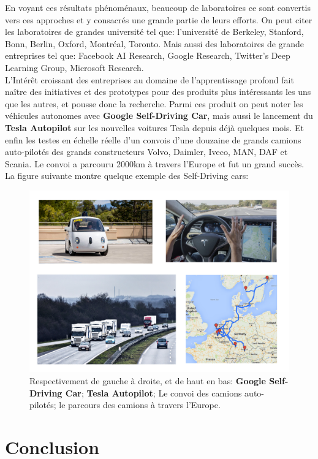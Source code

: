 	En voyant ces résultats phénoménaux, beaucoup de laboratoires ce sont convertis vers ces approches et y consacrés une grande partie de leurs efforts. On peut citer les laboratoires de grandes université tel que: l'université de Berkeley, Stanford, Bonn, Berlin, Oxford, Montréal, Toronto. Mais aussi des laboratoires de grande entreprises tel que: Facebook AI Research, Google Research, Twitter’s Deep Learning Group, Microsoft Research.\\

	L’Intérêt croissant des entreprises au domaine de l'apprentissage profond fait naître des initiatives et des prototypes pour des produits plus intéressants les uns que les autres, et pousse donc la recherche. Parmi ces produit on peut noter les véhicules autonomes avec \textbf{Google Self-Driving Car}, mais aussi le lancement du \textbf{Tesla Autopilot} sur les nouvelles voitures Tesla depuis déjà quelques mois. Et enfin les testes en échelle réelle d'un convois d'une douzaine de grands camions auto-pilotés des grands constructeurs Volvo, Daimler, Iveco, MAN, DAF et Scania. Le convoi a parcouru 2000km à travers l’Europe et fut un grand succès. La figure suivante montre quelque exemple des Self-Driving cars:

\begin{figure}[H]
	\centering
		\includegraphics[width=5in]{Figures/selfDriving.png}
	\caption[An Electron]{Respectivement de gauche à droite, et de haut en bas: \textbf{Google Self-Driving Car}; \textbf{Tesla Autopilot}; Le convoi des camions auto-pilotés; le parcours des camions à travers l'Europe.}
	\label{fig:Electron}
\end{figure}


\section{Conclusion}

